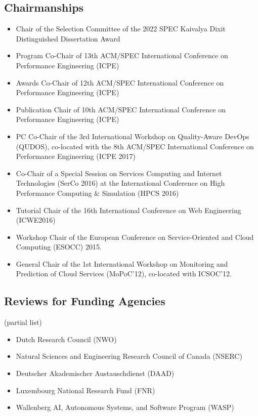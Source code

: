 \documentclass[paper=letter,fontsize=11pt]{scrartcl} %
\begin{document}
\subsection*{Chairmanships}
\begin{itemize}
\item Chair of the Selection Committee of the 2022 SPEC Kaivalya Dixit Distinguished Dissertation Award 
\item Program Co-Chair of 13th ACM/SPEC International Conference on Performance Engineering (ICPE) 
\item Awards Co-Chair of 12th ACM/SPEC International Conference on Performance Engineering (ICPE)
\item Publication Chair of 10th ACM/SPEC International Conference on Performance Engineering (ICPE)
\item PC Co-Chair of the  3rd International Workshop on Quality-Aware DevOps (QUDOS), co-located with the  8th ACM/SPEC International Conference on Performance Engineering (ICPE 2017)
\item Co-Chair of a Special Session on Services Computing and Internet Technologies (SerCo 2016) at the International Conference on High Performance Computing \& Simulation (HPCS 2016)
\item Tutorial Chair of the 16th International Conference on Web Engineering (ICWE2016)
\item Workshop Chair of the European Conference on Service-Oriented
and Cloud Computing (ESOCC) 2015.
\item General Chair of the 1st International Workshop on Monitoring and
Prediction of Cloud Services (MoPoC'12), co-located with ICSOC'12.
\end{itemize}


\subsection*{Reviews for Funding Agencies}

(partial list)

\begin{itemize}
  \item Dutch Research Council (NWO)
  \item Natural Sciences and Engineering Research Council of Canada (NSERC)
	\item Deutscher Akademischer Austauschdienst (DAAD)
	\item Luxembourg National Research Fund (FNR)
  \item Wallenberg AI, Autonomous Systems, and Software Program  (WASP)
\end{itemize}
\end{document}
